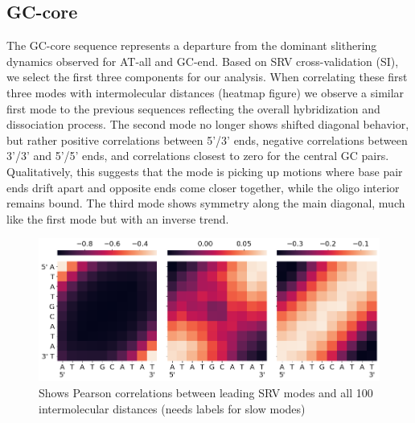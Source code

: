 \documentclass[journal=jpcbfk,manuscript=article]{achemso}
\begin{document}

\subsection{\label{sec:Results}GC-core}

The GC-core sequence represents a departure from the dominant slithering dynamics observed for AT-all and GC-end. Based on SRV cross-validation (SI), we select the first three components for our analysis. When correlating these first three modes with intermolecular distances (heatmap figure) we observe a similar first mode to the previous sequences reflecting the overall hybridization and dissociation process. The second mode no longer shows shifted diagonal behavior, but rather positive correlations between 5'/3' ends, negative correlations between 3'/3' and 5'/5' ends, and correlations closest to zero for the central GC pairs. Qualitatively, this suggests that the mode is picking up motions where base pair ends drift apart and opposite ends come closer together, while the oligo interior remains bound. The third mode shows symmetry along the main diagonal, much like the first mode but with an inverse trend. 

\begin{figure}[ht!]
	\begin{center}
        \includegraphics[width=\textwidth]{Figs/figs_0804/GC-core_srv_correlations.PNG}
        \caption{Shows Pearson correlations between leading SRV modes and all 100 intermolecular distances (needs labels for slow modes)}
        \label{fig:GC-core_srv_correlations}
	\end{center}
\end{figure}
\end{document}
